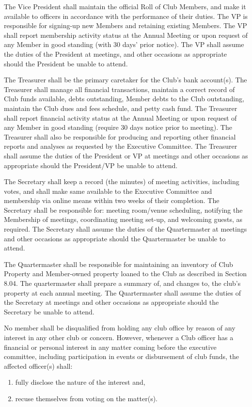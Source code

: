 \documentclass{bylaws}
\begin{document}
The Vice President shall maintain the official Roll of Club Members, and make it available to officers in accordance with the performance of their duties. The VP is responsible for signing-up new Members and retaining existing Members. The VP shall report membership activity status at the Annual Meeting or upon request of any Member in good standing (with 30 days' prior notice). The VP shall assume the duties of the President at meetings, and other occasions as appropriate should the President be unable to attend. 

The Treasurer shall be the primary caretaker for the Club’s bank account(s). The Treasurer shall manage all financial transactions, maintain a correct record of Club funds available, debts outstanding, Member debts to the Club outstanding, maintain the Club dues and fees schedule, and petty cash fund. The Treasurer shall report financial activity status at the Annual Meeting or upon request of any Member in good standing (require 30 days notice prior to meeting). The Treasurer shall also be responsible for producing and reporting other financial reports and analyses as requested by the Executive Committee. The Treasurer shall assume the duties of the President or VP at meetings and other occasions as appropriate should the President/VP be unable to attend. 

The Secretary shall keep a record (the minutes) of meeting activities, including votes, and shall make same available to the Executive Committee and membership via online means within two weeks of their completion. The Secretary shall be responsible for: meeting room/venue scheduling, notifying the Membership of meetings, coordinating meeting set-up, and welcoming guests, as required. The Secretary shall assume the duties of the Quartermaster at meetings and other occasions as appropriate should the Quartermaster be unable to attend. 

The Quartermaster shall be responsible for maintaining an inventory of Club Property and Member-owned property loaned to the Club as described in Section 8.04. The quartermaster shall prepare a summary of, and changes to, the club’s property at each annual meeting. The Quartermaster shall assume the duties of the Secretary at meetings and other occasions as appropriate should the Secretary be unable to attend. 

No member shall be disqualified from holding any club office by reason of any interest in any other club or concern. However, whenever a Club officer has a financial or personal interest in any matter coming before the executive committee, including participation in events or disbursement of club funds, the affected officer(s) shall: 
\begin{enumerate}
    \item fully disclose the nature of the interest and, 
    \item recuse themselves from voting on the matter(s).
\end{enumerate}
\end{document}
